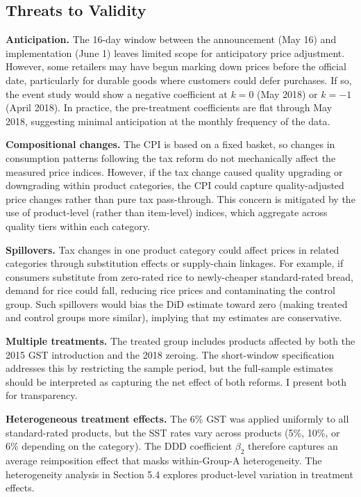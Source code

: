 \documentclass[12pt]{article}
\begin{document}
\subsection{Threats to Validity}

\textbf{Anticipation.} The 16-day window between the announcement (May 16) and implementation (June 1) leaves limited scope for anticipatory price adjustment. However, some retailers may have begun marking down prices before the official date, particularly for durable goods where customers could defer purchases. If so, the event study would show a negative coefficient at $k = 0$ (May 2018) or $k = -1$ (April 2018). In practice, the pre-treatment coefficients are flat through May 2018, suggesting minimal anticipation at the monthly frequency of the data.

\textbf{Compositional changes.} The CPI is based on a fixed basket, so changes in consumption patterns following the tax reform do not mechanically affect the measured price indices. However, if the tax change caused quality upgrading or downgrading within product categories, the CPI could capture quality-adjusted price changes rather than pure tax pass-through. This concern is mitigated by the use of product-level (rather than item-level) indices, which aggregate across quality tiers within each category.

\textbf{Spillovers.} Tax changes in one product category could affect prices in related categories through substitution effects or supply-chain linkages. For example, if consumers substitute from zero-rated rice to newly-cheaper standard-rated bread, demand for rice could fall, reducing rice prices and contaminating the control group. Such spillovers would bias the DiD estimate toward zero (making treated and control groups more similar), implying that my estimates are conservative.

\textbf{Multiple treatments.} The treated group includes products affected by both the 2015 GST introduction and the 2018 zeroing. The short-window specification addresses this by restricting the sample period, but the full-sample estimates should be interpreted as capturing the net effect of both reforms. I present both for transparency.

\textbf{Heterogeneous treatment effects.} The 6\% GST was applied uniformly to all standard-rated products, but the SST rates vary across products (5\%, 10\%, or 6\% depending on the category). The DDD coefficient $\beta_2$ therefore captures an average reimposition effect that masks within-Group-A heterogeneity. The heterogeneity analysis in Section 5.4 explores product-level variation in treatment effects.
\end{document}
